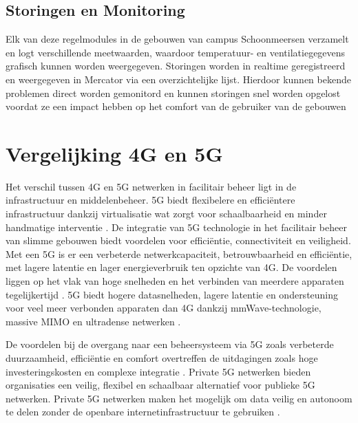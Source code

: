 \subsection{Storingen en Monitoring}
Elk van deze regelmodules in de gebouwen van campus Schoonmeersen verzamelt en logt verschillende meetwaarden, waardoor temperatuur- en ventilatiegegevens grafisch kunnen worden weergegeven.\newline\newline
Storingen worden in realtime geregistreerd en weergegeven in Mercator via een overzichtelijke lijst. Hierdoor kunnen bekende problemen direct worden gemonitord en kunnen storingen snel worden opgelost voordat ze een impact hebben op het comfort van de gebruiker van de  gebouwen


\section{Vergelijking 4G en 5G}
Het verschil tussen 4G en 5G netwerken in facilitair beheer ligt in de infrastructuur en middelenbeheer. 5G biedt flexibelere en efficiëntere infrastructuur dankzij virtualisatie wat zorgt voor schaalbaarheid en minder handmatige interventie \autocite{degambur2021resource}. De integratie van 5G technologie in het facilitair beheer van slimme gebouwen biedt voordelen voor efficiëntie, connectiviteit en veiligheid. Met een 5G is er een verbeterde netwerkcapaciteit, betrouwbaarheid en efficiëntie, met lagere latentie en lager energieverbruik ten opzichte van 4G. De voordelen liggen op het vlak van hoge snelheden en het verbinden van meerdere apparaten tegelijkertijd \autocite{mihret20214g}. 5G biedt hogere datasnelheden, lagere latentie en ondersteuning voor veel meer verbonden apparaten dan 4G dankzij mmWave-technologie, massive MIMO en ultradense netwerken \autocite{Hui_2020}.

De voordelen bij de overgang naar een beheersysteem via 5G zoals verbeterde duurzaamheid, efficiëntie en comfort overtreffen de uitdagingen zoals hoge investeringskosten en complexe integratie \autocite{Markogiannaki2023}. Private 5G netwerken bieden organisaties een veilig, flexibel en schaalbaar alternatief voor publieke 5G netwerken. Private 5G netwerken maken het mogelijk om data veilig en autonoom te delen zonder de openbare internetinfrastructuur te gebruiken \autocite{eswaran2023private}.





